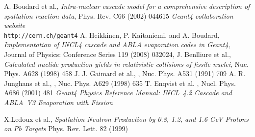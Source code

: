 \documentclass[a4paper]{jpconf}
\begin{document}
\begin{thebibliography}{9}

 A. Boudard et al., \emph{Intra-nuclear cascade model for
    a comprehensive description of spallation reaction data}, Phys.
  Rev. C66 (2002) 044615
 \emph{Geant4 collaboration website} \\ {\tt http://\-cern.ch/\-geant4}
A. Heikkinen, P. Kaitaniemi, and A. Boudard,
{\em Implementation of INCL4 cascade and ABLA evaporation codes in Geant4},
Journal of Physics: Conference Series 119 (2008) 032024, 
{\sf [doi:10.1088/1742-6596/119/3/032024]}
 J. Benlliure et al., \emph{Calculated nuclide
    production yields in relativistic collisions of fissile nuclei},
  Nuc. Phys. A628 (1998) 458
 J. J. Gaimard et al., \emph{},
  Nuc. Phys. A531 (1991) 709
 A. R. Junghans et al., \emph{},
  Nuc. Phys. A629 (1998) 635
 T. Enqvist et al. \emph{},
  Nucl. Phys. A686 (2001) 481
 \emph{Geant4 Physics Reference Manual: INCL~4.2 Cascade and ABLA~V3 Evaporation with Fission} 

 X.Ledoux et al., \emph{Spallation Neutron Production by
  0.8, 1.2, and 1.6 GeV Protons on Pb Targets} Phys. Rev. Lett. 82
  (1999)

\end{thebibliography}
\end{document}

